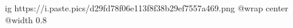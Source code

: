  
 
 
 
 

\ifcmt
  ig https://i.paste.pics/d29fd78f06e113f8f38b29ef7557a469.png
  @wrap center
  @width 0.8
\fi
